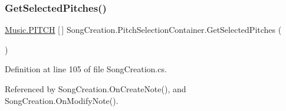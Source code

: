 \subsubsection{\texorpdfstring{Get\+Selected\+Pitches()}{GetSelectedPitches()}}
{\footnotesize\ttfamily \hyperlink{group___music_enums_ga508f69b199ea518f935486c990edac1d}{Music.\+P\+I\+T\+CH} \mbox{[}$\,$\mbox{]} Song\+Creation.\+Pitch\+Selection\+Container.\+Get\+Selected\+Pitches (\begin{DoxyParamCaption}{ }\end{DoxyParamCaption})}



Definition at line 105 of file Song\+Creation.\+cs.



Referenced by Song\+Creation.\+On\+Create\+Note(), and Song\+Creation.\+On\+Modify\+Note().


